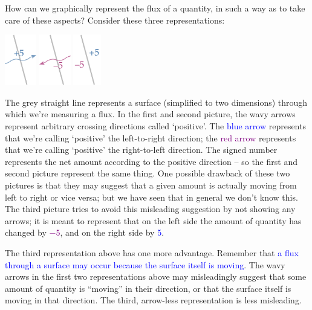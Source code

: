 \documentclass[a4paper,12pt,%
onecolumn,oneside,titlepage,%
british%
]{memoir}
\renewcommand*{\|}[1][]{\nonscript\:#1\vert\nonscript\:\mathopen{}}
\newcommand*{\sect}{\S}%
\renewcommand*{\autoref}[2]{\sidepar{\vspace{-1ex}\footnotesize{\color{blue}\faIcon{%
angle-right%
}\enspace\sect\,\ref{#1} page\,\pageref{#1}}}\textcolor{blue}{#2}}
\begin{document}
How can we graphically represent the flux of a quantity, in such a way as to take care of these aspects? Consider these three representations:
\begin{center}\label{fig:scalar_fluxes}
\hspace*{\fill}\includegraphics[height=6em]{images/flux_plus5c.pdf}
\hfill\includegraphics[height=6em]{images/flux_minus5c.pdf}
\hfill\includegraphics[height=6em]{images/flux_minusplus5.pdf}
\hspace*{\fill}
\end{center}
The \textcolor{midgrey}{grey straight line} represents a surface (simplified to two dimensions) through which we're measuring a flux. In the first and second picture, the wavy arrows represent arbitrary crossing directions called \enquote*{positive}. The \textcolor{blue}{blue arrow} represents that we're calling \enquote*{positive} the left-to-right direction; the \textcolor{purple}{red arrow} represents that we're calling \enquote*{positive} the right-to-left direction. The signed number represents the net amount according to the positive direction -- so the first and second picture represent the same thing. One possible drawback of these two pictures is that they may suggest that a given amount is actually moving from left to right or vice versa; but we have seen that in general we don't know this.
The third picture tries to avoid this misleading suggestion by not showing any arrows; it is meant to represent that on the left side the amount of quantity has changed by \textcolor{purple}{\num{-5}}, and on the right side by \textcolor{blue}{\num{+5}}.

The third representation above has one more advantage. Remember that \autoref{sec:choice_surfaces}{a flux through a surface may occur because the surface itself is moving}. The wavy arrows in the first two representations above may misleadingly suggest that some amount of quantity is \enquote{moving} in their direction, or that the surface itself is moving in that direction. The third, arrow-less representation is less misleading.
\end{document}
